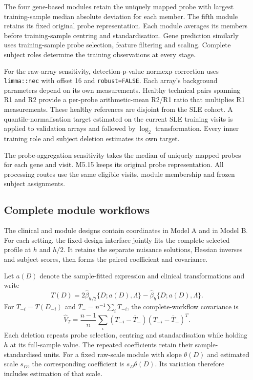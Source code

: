 The four gene-based modules retain the uniquely mapped probe with
largest training-sample median absolute deviation for each member.
The fifth module retains its fixed original probe representation.
Each module averages its members before training-sample centring
and standardisation. Gene prediction similarly uses training-sample
probe selection, feature filtering and scaling. Complete subject
roles determine the training observations at every stage.

For the raw-array sensitivity, detection-p-value normexp correction
uses \texttt{limma::nec} with offset 16 and
\texttt{robust=FALSE}. Each array's background parameters depend on
its own measurements. Healthy technical pairs spanning R1 and R2
provide a per-probe arithmetic-mean R2/R1 ratio that multiplies R1
measurements. These healthy references are disjoint from the SLE
cohort. A quantile-normalisation target estimated on the current
SLE training visits is applied to validation arrays and followed
by $\log_2$ transformation. Every inner training role and subject
deletion estimates its own target.

The probe-aggregation sensitivity takes the median of uniquely
mapped probes for each gene and visit. M5.15 keeps its original
probe representation. All processing routes use the same eligible
visits, module membership and frozen subject assignments.

\subsection{Complete module workflows}

The clinical and module designs contain \SLEModelADimension{}
coordinates in Model A and \SLEModelBDimension{} in Model B.
For each setting, the fixed-design interface jointly fits the
complete selected profile at $h$ and $h/2$. It retains the separate
nuisance solutions, Hessian inverses and subject scores, then forms
the paired coefficient and covariance.

Let $a(D)$ denote the sample-fitted expression and clinical
transformations and write
\[
 T(D)=2\widehat\beta_{h/2}\{D;a(D),\Lambda\}
                      -\widehat\beta_h\{D;a(D),\Lambda\}.
\]
For $T_{-i}=T(D_{-i})$ and
$\overline T_-=n^{-1}\sum_iT_{-i}$, the complete-workflow covariance
is
\[
 \widehat V_T=\frac{n-1}{n}\sum_i
       (T_{-i}-\overline T_-)(T_{-i}-\overline T_-)^T.
\]
Each deletion repeats probe selection, centring and standardisation
while holding $h$ at its full-sample value. The repeated
coefficients retain their sample-standardised units. For a fixed
raw-scale module with slope $\theta(D)$ and estimated scale $s_D$,
the corresponding coefficient is $s_D\theta(D)$. Its variation
therefore includes estimation of that scale.

